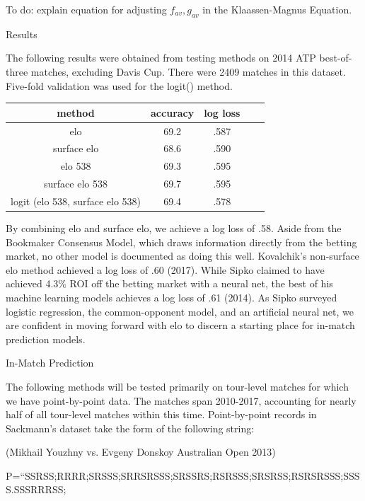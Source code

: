 \documentclass[11pt]{article}
\begin{document}
To do: explain equation for adjusting $f_{av},g_{av}$ in the Klaassen-Magnus Equation.



\vskip 1cm
Results

The following results were obtained from testing methods on 2014 ATP best-of-three matches, excluding Davis Cup. There were 2409 matches in this dataset. Five-fold validation was used for the logit() method.

\begin{center}
\begin{tabular}{ |c|c|c|c|c| } 
 \hline
 method & accuracy & log loss
 &  &  \\ 
 \hline
  elo & 69.2 & .587
 &  &  \\ 
 \hline
 surface elo & 68.6 & .590
 &  &  \\ 
 \hline
 elo 538 & 69.3 & .595
 &  &  \\ 
 \hline
 surface elo 538 & 69.7 & .595
 &  &  \\ 
 \hline
 logit (elo 538, surface elo 538) & 69.4 & .578
 &  &  \\ 
 \hline
 
\end{tabular}
\end{center}

By combining elo and surface elo, we achieve a log loss of .58. Aside from the Bookmaker Consensus Model, which draws information directly from the betting market, no other model is documented as doing this well. Kovalchik's non-surface elo method achieved a log loss of .60 (2017). While Sipko claimed to have achieved 4.3$\%$ ROI off the betting market with a neural net, the best of his machine learning models achieves a log loss of .61 (2014). As Sipko surveyed logistic regression, the common-opponent model, and an artificial neural net, we are confident in moving forward with elo to discern a starting place for in-match prediction models.

\newpage

In-Match Prediction

The following methods will be tested primarily on tour-level matches for which we have point-by-point data. The matches span 2010-2017, accounting for nearly half of all tour-level matches within this time. Point-by-point records in Sackmann's dataset take the form of the following string:

(Mikhail Youzhny vs. Evgeny Donskoy Australian Open 2013)

P=``SSRSS;RRRR;SRSSS;SRRSRSSS;SRSSRS;RSRSSS;SRSRSS;RSRSRSSS;SSSS.SSSRRRSS;
\end{document}
